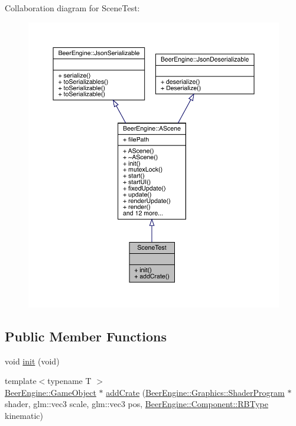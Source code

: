 Collaboration diagram for Scene\+Test\+:\nopagebreak
\begin{figure}[H]
\begin{center}
\leavevmode
\includegraphics[width=350pt]{class_scene_test__coll__graph}
\end{center}
\end{figure}
\subsection*{Public Member Functions}
\begin{DoxyCompactItemize}
\item 
void \mbox{\hyperlink{class_scene_test_aedded03410798c3705fb3fb028e56ab5}{init}} (void)
\item 
{\footnotesize template$<$typename T $>$ }\\\mbox{\hyperlink{class_beer_engine_1_1_game_object}{Beer\+Engine\+::\+Game\+Object}} $\ast$ \mbox{\hyperlink{class_scene_test_a29d4ffbd6a5035a4d62e9e59b311f791}{add\+Crate}} (\mbox{\hyperlink{class_beer_engine_1_1_graphics_1_1_shader_program}{Beer\+Engine\+::\+Graphics\+::\+Shader\+Program}} $\ast$shader, glm\+::vec3 scale, glm\+::vec3 pos, \mbox{\hyperlink{namespace_beer_engine_1_1_component_a2cfe279cc309b6420e792597940b8a33}{Beer\+Engine\+::\+Component\+::\+R\+B\+Type}} kinematic)
\end{DoxyCompactItemize}
